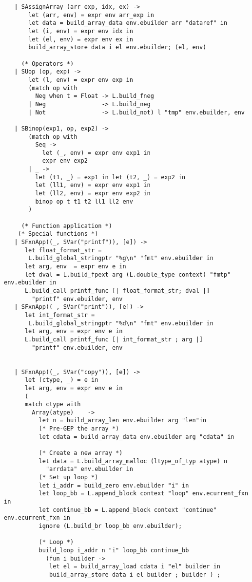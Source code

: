 \documentclass[main.tex]{subfiles}
\begin{document}
\begin{lstlisting}
   | SAssignArray (arr_exp, idx, ex) ->
       let (arr, env) = expr env arr_exp in
       let data = build_array_data env.ebuilder arr "dataref" in
       let (i, env) = expr env idx in
       let (el, env) = expr env ex in
       build_array_store data i el env.ebuilder; (el, env)

     (* Operators *)
   | SUop (op, exp) ->
       let (l, env) = expr env exp in
       (match op with
         Neg when t = Float -> L.build_fneg
       | Neg                -> L.build_neg
       | Not                -> L.build_not) l "tmp" env.ebuilder, env

   | SBinop(exp1, op, exp2) ->
       (match op with
         Seq ->
           let (_, env) = expr env exp1 in
           expr env exp2 
       | _ -> 
         let (t1, _) = exp1 in let (t2, _) = exp2 in
         let (ll1, env) = expr env exp1 in
         let (ll2, env) = expr env exp2 in
         binop op t t1 t2 ll1 ll2 env       
       )

     (* Function application *)
    (* Special functions *)
   | SFxnApp((_, SVar("printf")), [e]) -> 
      let float_format_str =
       L.build_global_stringptr "%g\n" "fmt" env.ebuilder in
      let arg, env  = expr env e in 
      let dval = L.build_fpext arg (L.double_type context) "fmtp" env.ebuilder in
      L.build_call printf_func [| float_format_str; dval |]
        "printf" env.ebuilder, env
   | SFxnApp((_, SVar("print")), [e]) ->
      let int_format_str = 
       L.build_global_stringptr "%d\n" "fmt" env.ebuilder in
      let arg, env = expr env e in
      L.build_call printf_func [| int_format_str ; arg |]
        "printf" env.ebuilder, env


   | SFxnApp((_, SVar("copy")), [e]) ->
      let (ctype, _) = e in
      let arg, env = expr env e in
      (
      match ctype with
        Array(atype)    -> 
          let n = build_array_len env.ebuilder arg "len"in
          (* Pre-GEP the array *)
          let cdata = build_array_data env.ebuilder arg "cdata" in
     
          (* Create a new array *)
          let data = L.build_array_malloc (ltype_of_typ atype) n
            "arrdata" env.ebuilder in
          (* Set up loop *)
          let i_addr = build_zero env.ebuilder "i" in
          let loop_bb = L.append_block context "loop" env.ecurrent_fxn in
          let continue_bb = L.append_block context "continue" env.ecurrent_fxn in
          ignore (L.build_br loop_bb env.ebuilder);

          (* Loop *)
          build_loop i_addr n "i" loop_bb continue_bb
            (fun i builder ->
             let el = build_array_load cdata i "el" builder in
             build_array_store data i el builder ; builder ) ;


\end{lstlisting}
\end{document}
